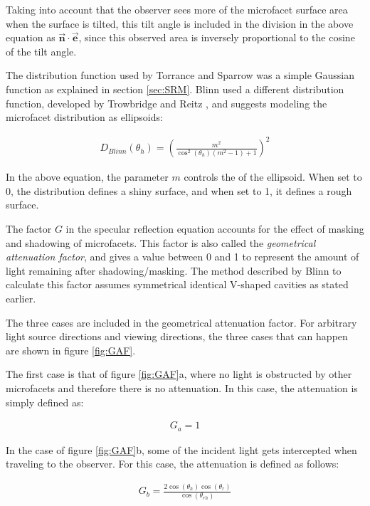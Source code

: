 Taking into account that the observer sees more of the microfacet surface area when the surface is tilted, this tilt angle is included in the division in the above equation as $\vec{\mathbf{n}} \cdot \vec{\mathbf{e}}$, since this observed area is inversely proportional to the cosine of the tilt angle.

The distribution function used by Torrance and Sparrow was a simple Gaussian function as explained in section \ref{sec:SRM}. Blinn used a different distribution function, developed by Trowbridge and Reitz , and suggests modeling the microfacet distribution as ellipsoids:

	\begin{eqnarray*}
		D_{Blinn}(\theta_h) = \left({ \frac{m^2}{\cos^2(\theta_h)(m^2-1)+1} } \right)^2
	\end{eqnarray*}

\noindent In the above equation, the parameter $m$ controls the  of the ellipsoid. When set to 0, the distribution defines a shiny surface, and when set to 1, it defines a rough surface.

The factor $G$ in the specular reflection equation accounts for the effect of masking and shadowing of microfacets. This factor is also called the \textit{geometrical attenuation factor}, and gives a value between 0 and 1 to represent the amount of light remaining after shadowing/masking. The method described by Blinn to calculate this factor assumes symmetrical identical V-shaped cavities as stated earlier. 

The three cases are included in the geometrical attenuation factor. For arbitrary light source directions and viewing directions, the three cases that can happen are shown in figure \ref{fig:GAF}.

The first case is that of figure \ref{fig:GAF}a, where no light is obstructed by other microfacets and therefore there is no attenuation. In this case, the attenuation is simply defined as:

	\begin{eqnarray*}
		G_a = 1
	\end{eqnarray*}

In the case of figure \ref{fig:GAF}b, some of the incident light gets intercepted when traveling to the observer. For this case, the attenuation is defined as follows:

	\begin{eqnarray*}
		G_b = \frac{2\cos(\theta_h)\cos(\theta_r)}{\cos(\theta_{rh})}
	\end{eqnarray*}

